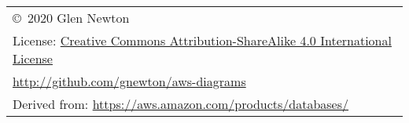                   \tiny
                  \begin{tabular}{l}
                  \\
                    \copyright \ 2020 Glen Newton\\
                    License: \href{https://creativecommons.org/licenses/by-sa/4.0/legalcode}{Creative Commons Attribution-ShareAlike 4.0 International License}\\
                    \url{http://github.com/gnewton/aws-diagrams} \\
                    Derived from: \url{https://aws.amazon.com/products/databases/}
                  \end{tabular}
